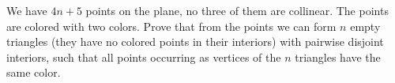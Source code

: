 We have $4n + 5$ points on the plane, no three of them are collinear. The points are colored with two colors. Prove that from the points we can form $n$ empty triangles (they have no colored points in their interiors) with pairwise disjoint interiors, such that all points occurring as vertices of the $n$ triangles have the same color.